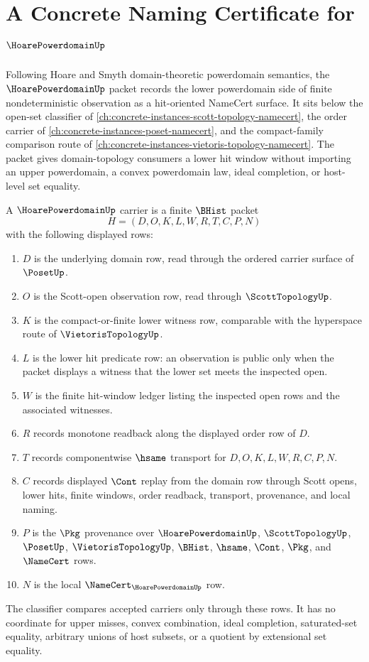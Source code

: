\chapter{A Concrete Naming Certificate for $\HoarePowerdomainUp$}
\label{ch:concrete-instances-hoare-powerdomain-namecert}

Following Hoare and Smyth domain-theoretic powerdomain semantics, the $\HoarePowerdomainUp$ packet records the lower powerdomain side of finite nondeterministic observation as a hit-oriented NameCert surface. It sits below the open-set classifier of \autoref{ch:concrete-instances-scott-topology-namecert}, the order carrier of \autoref{ch:concrete-instances-poset-namecert}, and the compact-family comparison route of \autoref{ch:concrete-instances-vietoris-topology-namecert}. The packet gives domain-topology consumers a lower hit window without importing an upper powerdomain, a convex powerdomain law, ideal completion, or host-level set equality.

\begin{definition}
\label{def:hoare-powerdomain-carrier}
A $\HoarePowerdomainUp$ carrier is a finite $\BHist$ packet
$$
H=(D,O,K,L,W,R,T,C,P,N)
$$
with the following displayed rows:
\begin{enumerate}
\item $D$ is the underlying domain row, read through the ordered carrier surface of $\PosetUp$.
\item $O$ is the Scott-open observation row, read through $\ScottTopologyUp$.
\item $K$ is the compact-or-finite lower witness row, comparable with the hyperspace route of $\VietorisTopologyUp$.
\item $L$ is the lower hit predicate row: an observation is public only when the packet displays a witness that the lower set meets the inspected open.
\item $W$ is the finite hit-window ledger listing the inspected open rows and the associated witnesses.
\item $R$ records monotone readback along the displayed order row of $D$.
\item $T$ records componentwise $\hsame$ transport for $D,O,K,L,W,R,C,P,N$.
\item $C$ records displayed $\Cont$ replay from the domain row through Scott opens, lower hits, finite windows, order readback, transport, provenance, and local naming.
\item $P$ is the $\Pkg$ provenance over $\HoarePowerdomainUp$, $\ScottTopologyUp$, $\PosetUp$, $\VietorisTopologyUp$, $\BHist$, $\hsame$, $\Cont$, $\Pkg$, and $\NameCert$ rows.
\item $N$ is the local $\NameCert_{\HoarePowerdomainUp}$ row.
\end{enumerate}
The classifier compares accepted carriers only through these rows. It has no coordinate for upper misses, convex combination, ideal completion, saturated-set equality, arbitrary unions of host subsets, or a quotient by extensional set equality.
\end{definition}

